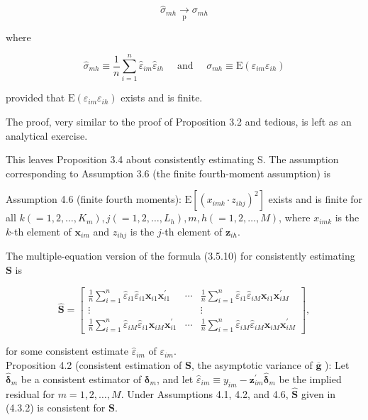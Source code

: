 \documentclass[10pt]{article}
\begin{document}
\begin{equation*}
\hat{\sigma}_{m h} \underset{\mathrm{p}}{\rightarrow} \sigma_{m h} \tag{4.3.1}
\end{equation*}


where

$$
\hat{\sigma}_{m h} \equiv \frac{1}{n} \sum_{i=1}^{n} \hat{\varepsilon}_{i m} \hat{\varepsilon}_{i h} \quad \text { and } \quad \sigma_{m h} \equiv \mathrm{E}\left(\varepsilon_{i m} \varepsilon_{i h}\right)
$$

provided that $\mathrm{E}\left(\varepsilon_{i m} \varepsilon_{i h}\right)$ exists and is finite.

The proof, very similar to the proof of Proposition 3.2 and tedious, is left as an analytical exercise.

This leaves Proposition 3.4 about consistently estimating S. The assumption corresponding to Assumption 3.6 (the finite fourth-moment assumption) is

Assumption 4.6 (finite fourth moments): $\mathrm{E}\left[\left(x_{i m k} \cdot z_{i h j}\right)^{2}\right]$ exists and is finite for all $k\left(=1,2, \ldots, K_{m}\right), j\left(=1,2, \ldots, L_{h}\right), m, h(=1,2, \ldots, M)$, where $x_{i m k}$ is the $k$-th element of $\mathbf{x}_{i m}$ and $z_{i h j}$ is the $j$-th element of $\mathbf{z}_{i h}$.

The multiple-equation version of the formula (3.5.10) for consistently estimating $\mathbf{S}$ is

\[
\widehat{\mathbf{S}}=\left[\begin{array}{ccc}
\frac{1}{n} \sum_{i=1}^{n} \hat{\varepsilon}_{i 1} \hat{\varepsilon}_{i 1} \mathbf{x}_{i 1} \mathbf{x}_{i 1}^{\prime} & \cdots & \frac{1}{n} \sum_{i=1}^{n} \hat{\varepsilon}_{i 1} \hat{\varepsilon}_{i M} \mathbf{x}_{i 1} \mathbf{x}_{i M}^{\prime}  \tag{4.3.2}\\
\vdots & & \vdots \\
\frac{1}{n} \sum_{i=1}^{n} \hat{\varepsilon}_{i M} \hat{\varepsilon}_{i 1} \mathbf{x}_{i M} \mathbf{x}_{i 1}^{\prime} & \cdots & \frac{1}{n} \sum_{i=1}^{n} \hat{\varepsilon}_{i M} \hat{\varepsilon}_{i M} \mathbf{x}_{i M} \mathbf{x}_{i M}^{\prime}
\end{array}\right],
\]

for some consistent estimate $\hat{\varepsilon}_{i m}$ of $\varepsilon_{i m}$.\\
Proposition 4.2 (consistent estimation of $\mathbf{S}$, the asymptotic variance of $\overline{\mathbf{g}}$ ): Let $\hat{\boldsymbol{\delta}}_{m}$ be a consistent estimator of $\boldsymbol{\delta}_{m}$, and let $\hat{\varepsilon}_{i m} \equiv y_{i m}-\mathbf{z}_{i m}^{\prime} \hat{\boldsymbol{\delta}}_{m}$ be the implied residual for $m=1,2, \ldots, M$. Under Assumptions 4.1, 4.2, and 4.6, $\widehat{\mathbf{S}}$ given in (4.3.2) is consistent for $\mathbf{S}$.
\end{document}
